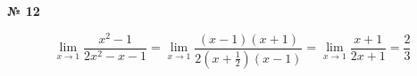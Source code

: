 \documentclass{article}
\begin{document}
\textbf{№ 12} 

\begingroup
\Large

$$ \lim\limits_{x \to 1} \frac{x^2-1}{2x^2-x-1}
= \lim\limits_{x \to 1} \frac{(x-1)(x+1)}{2(x+\frac{1}{2})(x-1)}
= \lim\limits_{x \to 1} \frac{x+1}{2x+1} 
= \frac{2}{3}$$

\endgroup
\end{document}
